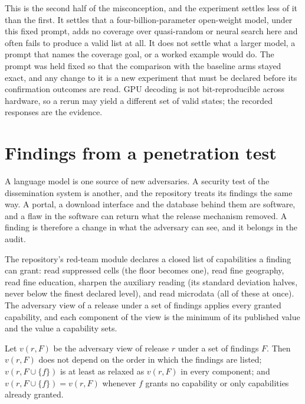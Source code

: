 This is the second half of the misconception, and the experiment settles less of it
than the first. It settles that a four-billion-parameter open-weight model, under this
fixed prompt, adds no coverage over quasi-random or neural search here and often fails
to produce a valid list at all. It does not settle what a larger model, a prompt that
names the coverage goal, or a worked example would do. The prompt was held fixed so
that the comparison with the baseline arms stayed exact, and any change to it is a new
experiment that must be declared before its confirmation outcomes are read. GPU
decoding is not bit-reproducible across hardware, so a rerun may yield a different set
of valid states; the recorded responses are the evidence.

\section{Findings from a penetration test}\label{c14:sec-pentest}

A language model is one source of new adversaries. A security test of the
dissemination system is another, and the repository treats its findings the same way.
A portal, a download interface and the database behind them are software, and a flaw in
the software can return what the release mechanism removed. A finding is therefore a
change in what the adversary can see, and it belongs in the audit.

The repository's red-team module declares a closed list of capabilities a finding can
grant: read suppressed cells (the floor becomes one), read fine geography, read fine
education, sharpen the auxiliary reading (its standard deviation halves, never below
the finest declared level), and read microdata (all of these at once). The adversary
view of a release under a set of findings applies every granted capability, and each
component of the view is the minimum of its published value and the value a capability
sets.

\begin{proposition}\label{c14:prop-compose}
Let $v(r, F)$ be the adversary view of release $r$ under a set of findings $F$. Then
$v(r,F)$ does not depend on the order in which the findings are listed;
$v(r, F \cup \{f\})$ is at least as relaxed as $v(r,F)$ in every component; and
$v(r, F\cup\{f\}) = v(r,F)$ whenever $f$ grants no capability or only capabilities
already granted.
\end{proposition}

